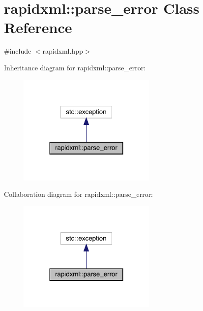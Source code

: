 \hypertarget{classrapidxml_1_1parse__error}{}\section{rapidxml\+::parse\+\_\+error Class Reference}
\label{classrapidxml_1_1parse__error}


{\ttfamily \#include $<$rapidxml.\+hpp$>$}



Inheritance diagram for rapidxml\+::parse\+\_\+error\+:\nopagebreak
\begin{figure}[H]
\begin{center}
\leavevmode
\includegraphics[width=191pt]{classrapidxml_1_1parse__error__inherit__graph}
\end{center}
\end{figure}


Collaboration diagram for rapidxml\+::parse\+\_\+error\+:\nopagebreak
\begin{figure}[H]
\begin{center}
\leavevmode
\includegraphics[width=191pt]{classrapidxml_1_1parse__error__coll__graph}
\end{center}
\end{figure}
